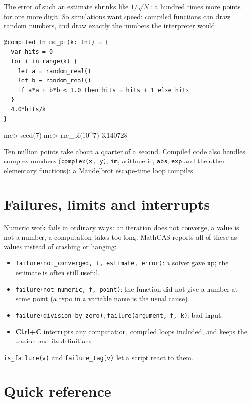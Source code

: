 \documentclass[11pt,a4paper]{article}
\newcommand{\code}[1]{\texttt{#1}}
\begin{document}
\noindent The error of such an estimate shrinks like $1/\sqrt{N}$: a hundred times more points for one more
digit. So simulations want speed: compiled functions can draw random numbers, and draw exactly the numbers
the interpreter would.

\begin{lstlisting}
@compiled fn mc_pi(k: Int) = {
  var hits = 0
  for i in range(k) {
    let a = random_real()
    let b = random_real()
    if a*a + b*b < 1.0 then hits = hits + 1 else hits
  }
  4.0*hits/k
}
\end{lstlisting}
\begin{repl}
mc> seed(7)
mc> mc_pi(10^7)
3.140728
\end{repl}

\noindent Ten million points take about a quarter of a second. Compiled code also handles complex numbers
(\code{complex(x, y)}, \code{im}, arithmetic, \code{abs}, \code{exp} and the other elementary functions): a
Mandelbrot escape-time loop compiles.

\section{Failures, limits and interrupts}

Numeric work fails in ordinary ways: an iteration does not converge, a value is not a number, a computation
takes too long. MathCAS reports all of these as values instead of crashing or hanging:

\begin{itemize}
  \item \code{failure(not\_converged, f, estimate, error)}: a solver gave up; the estimate is often still
    useful.
  \item \code{failure(not\_numeric, f, point)}: the function did not give a number at some point (a typo in a
    variable name is the usual cause).
  \item \code{failure(division\_by\_zero)}, \code{failure(argument, f, k)}: bad input.
  \item \textbf{Ctrl+C} interrupts any computation, compiled loops included, and keeps the session and its
    definitions.
\end{itemize}

\noindent \code{is\_failure(v)} and \code{failure\_tag(v)} let a script react to them.

\section{Quick reference}
\end{document}
